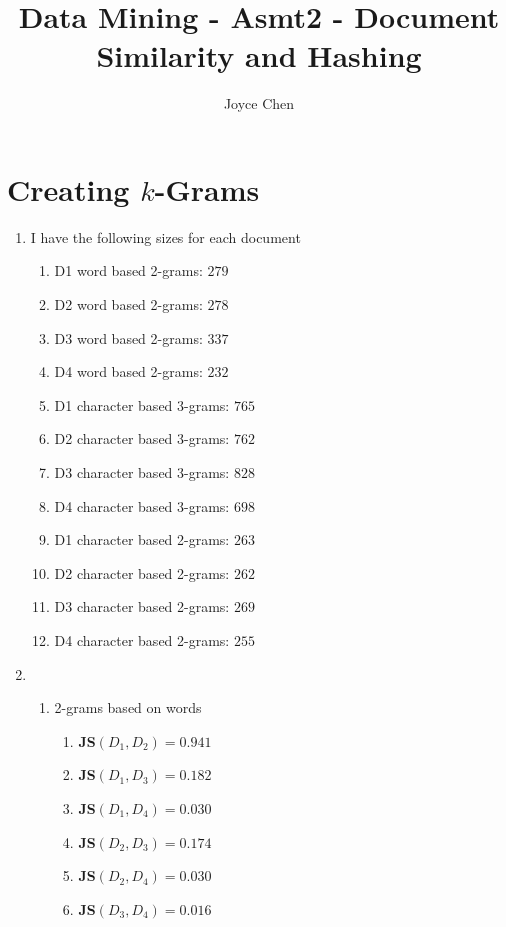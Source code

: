 \documentclass[11pt]{article}
\title{Data Mining - Asmt2 - Document Similarity and Hashing}
\author{Joyce Chen}
\begin{document}
\maketitle

\section{Creating $k$-Grams}
\begin{enumerate}[label=\textbf{\Alph*:}]
\item
I have the following sizes for each document \\
\begin{enumerate}[label=\arabic*)]
\item
D1 word based 2-grams: $279$
\item
D2 word based 2-grams: $278$
\item
D3 word based 2-grams: $337$
\item
D4 word based 2-grams: $232$
\item
D1 character based 3-grams: $765$
\item
D2 character based 3-grams: $762$
\item
D3 character based 3-grams: $828$
\item
D4 character based 3-grams: $698$
\item
D1 character based 2-grams: $263$
\item
D2 character based 2-grams: $262$
\item
D3 character based 2-grams: $269$
\item
D4 character based 2-grams: $255$
\end{enumerate}

\item
\begin{enumerate}[label=B.\arabic*]
\item
2-grams based on words
\begin{enumerate}[label=\arabic*)]
\item
\textbf{JS}$(D_{1}, D_{2}) = 0.941$
\item
\textbf{JS}$(D_{1}, D_{3}) = 0.182$
\item
\textbf{JS}$(D_{1}, D_{4}) = 0.030$
\item
\textbf{JS}$(D_{2}, D_{3}) = 0.174$
\item
\textbf{JS}$(D_{2}, D_{4}) = 0.030$
\item
\textbf{JS}$(D_{3}, D_{4}) = 0.016$
\end{enumerate}


\end{enumerate}
\end{enumerate}
\end{document}
